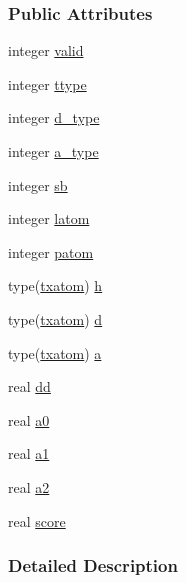 \subsubsection*{Public Attributes}
\begin{DoxyCompactItemize}
\item 
integer \hyperlink{structcalc__xscore_1_1txhbond_a0e458ce73a92ab93b106877433606452}{valid}
\item 
integer \hyperlink{structcalc__xscore_1_1txhbond_a4d2b590837def57b6fe2fd16ec010760}{ttype}
\item 
integer \hyperlink{structcalc__xscore_1_1txhbond_a7f426033055571100b3ddffc8803df22}{d\-\_\-type}
\item 
integer \hyperlink{structcalc__xscore_1_1txhbond_a382a8f51adadbe6de46cf13d904a3d28}{a\-\_\-type}
\item 
integer \hyperlink{structcalc__xscore_1_1txhbond_a5f7491141bb1b9152340be76865166f9}{sb}
\item 
integer \hyperlink{structcalc__xscore_1_1txhbond_a915d5693280ca73b890e91353435111d}{latom}
\item 
integer \hyperlink{structcalc__xscore_1_1txhbond_aa7f6e74c218dc6aec5a1d0a67d11ec2b}{patom}
\item 
type(\hyperlink{structcalc__xscore_1_1txatom}{txatom}) \hyperlink{structcalc__xscore_1_1txhbond_a8a35afafa617a2f3f94c5ef73b98cc22}{h}
\item 
type(\hyperlink{structcalc__xscore_1_1txatom}{txatom}) \hyperlink{structcalc__xscore_1_1txhbond_aefdd4a20d71e171dbec76aa30c71c6ce}{d}
\item 
type(\hyperlink{structcalc__xscore_1_1txatom}{txatom}) \hyperlink{structcalc__xscore_1_1txhbond_acb8f0f1efa056d3aa00e465f890da223}{a}
\item 
real \hyperlink{structcalc__xscore_1_1txhbond_acc04a9a42c832c792760fbb8caaaa523}{dd}
\item 
real \hyperlink{structcalc__xscore_1_1txhbond_a2221410b6e6172dc69ff3f7f3d38a7f8}{a0}
\item 
real \hyperlink{structcalc__xscore_1_1txhbond_a550fb9478e5cfa94cdad440db46fc2e8}{a1}
\item 
real \hyperlink{structcalc__xscore_1_1txhbond_a16ab8c264282aa82297a86035b59dca6}{a2}
\item 
real \hyperlink{structcalc__xscore_1_1txhbond_ad2113b3edb440b395e87407baca90a29}{score}
\end{DoxyCompactItemize}


\subsubsection{Detailed Description}


